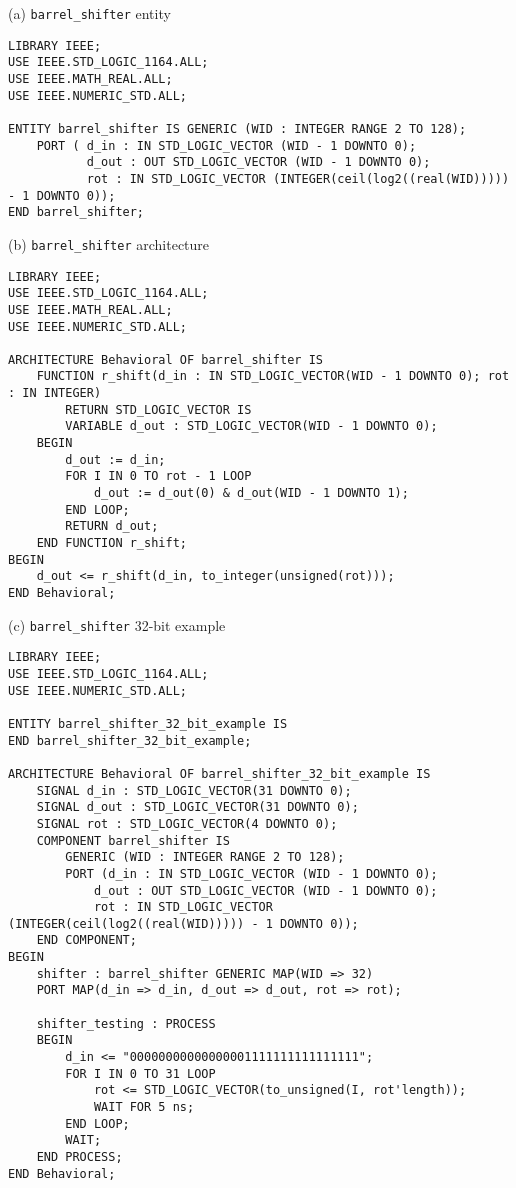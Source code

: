 \documentclass{article}
\begin{document}
(a) \texttt{barrel\_shifter} entity

\begin{verbatim}
LIBRARY IEEE;
USE IEEE.STD_LOGIC_1164.ALL;
USE IEEE.MATH_REAL.ALL;
USE IEEE.NUMERIC_STD.ALL;

ENTITY barrel_shifter IS GENERIC (WID : INTEGER RANGE 2 TO 128);
    PORT ( d_in : IN STD_LOGIC_VECTOR (WID - 1 DOWNTO 0);
           d_out : OUT STD_LOGIC_VECTOR (WID - 1 DOWNTO 0);
           rot : IN STD_LOGIC_VECTOR (INTEGER(ceil(log2((real(WID))))) - 1 DOWNTO 0));
END barrel_shifter;
\end{verbatim} 
\newpage
(b) \texttt{barrel\_shifter} architecture

\begin{verbatim}
LIBRARY IEEE;
USE IEEE.STD_LOGIC_1164.ALL;
USE IEEE.MATH_REAL.ALL;
USE IEEE.NUMERIC_STD.ALL;

ARCHITECTURE Behavioral OF barrel_shifter IS
    FUNCTION r_shift(d_in : IN STD_LOGIC_VECTOR(WID - 1 DOWNTO 0); rot : IN INTEGER)
        RETURN STD_LOGIC_VECTOR IS
        VARIABLE d_out : STD_LOGIC_VECTOR(WID - 1 DOWNTO 0);
    BEGIN
        d_out := d_in;
        FOR I IN 0 TO rot - 1 LOOP
            d_out := d_out(0) & d_out(WID - 1 DOWNTO 1);
        END LOOP;
        RETURN d_out;
    END FUNCTION r_shift;
BEGIN
    d_out <= r_shift(d_in, to_integer(unsigned(rot)));
END Behavioral;
\end{verbatim} 

(c) \texttt{barrel\_shifter} 32-bit example

\begin{verbatim}
LIBRARY IEEE;
USE IEEE.STD_LOGIC_1164.ALL;
USE IEEE.NUMERIC_STD.ALL;

ENTITY barrel_shifter_32_bit_example IS
END barrel_shifter_32_bit_example;

ARCHITECTURE Behavioral OF barrel_shifter_32_bit_example IS
    SIGNAL d_in : STD_LOGIC_VECTOR(31 DOWNTO 0);
    SIGNAL d_out : STD_LOGIC_VECTOR(31 DOWNTO 0);
    SIGNAL rot : STD_LOGIC_VECTOR(4 DOWNTO 0);
    COMPONENT barrel_shifter IS
        GENERIC (WID : INTEGER RANGE 2 TO 128);
        PORT (d_in : IN STD_LOGIC_VECTOR (WID - 1 DOWNTO 0);
            d_out : OUT STD_LOGIC_VECTOR (WID - 1 DOWNTO 0);
            rot : IN STD_LOGIC_VECTOR (INTEGER(ceil(log2((real(WID))))) - 1 DOWNTO 0));
    END COMPONENT;
BEGIN
    shifter : barrel_shifter GENERIC MAP(WID => 32)
    PORT MAP(d_in => d_in, d_out => d_out, rot => rot);

    shifter_testing : PROCESS
    BEGIN
        d_in <= "00000000000000001111111111111111";
        FOR I IN 0 TO 31 LOOP
            rot <= STD_LOGIC_VECTOR(to_unsigned(I, rot'length));
            WAIT FOR 5 ns;
        END LOOP;
        WAIT;
    END PROCESS;
END Behavioral;
\end{verbatim} 
\end{document}
